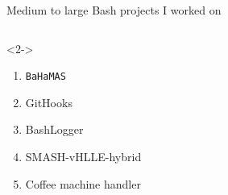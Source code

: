 
\begin{frame}{Medium to large Bash projects I worked on}
    \large
    \addtolength{\leftmargini}{2em}
    \begin{columns}[T]
        \begin{column}{0.45\textwidth}
            \begin{uncoverenv}<2->
                \begin{enumerate}
                    \item \texttt{BaHaMAS}
                    \item GitHooks
                    \item BashLogger
                    \item SMASH-vHLLE-hybrid
                    \item \textcolor{bg!85!normal text.fg}{Coffee machine handler}
                \end{enumerate}
            \end{uncoverenv}
        \end{column}
        \begin{column}{0.45\textwidth}
            \centering
        \end{column}
    \end{columns}
\end{frame}
\begingroup
    \newcommand{\bahamas}{\texttt{BaHaMAS}}
